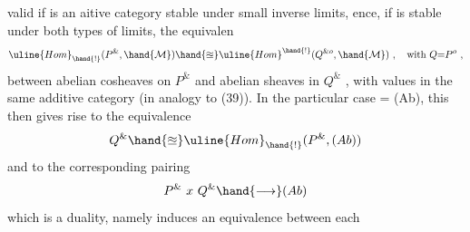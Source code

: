 valid if  is an aitive category stable under small inverse limits,
 ence, if  is  stable under both types of limits, the equivalen
\margin{(***)}
\[ \uline{Hom}_{\hand{!}}(P^{\&}, \hand{\mathcal{M}}) \hand{\approxeq} \uline{Hom}^{\hand{!}}(Q^{\& o}, \hand{\mathcal{M}}) \ , \quad \text{with } Q{=}P^{o} \ , \]
between abelian cosheaves on $P^{\&}$ and abelian sheaves in $Q^{\&}$ , with values
in the same  additive category (in analogy to (39)). In the
particular case = (Ab), this then gives rise to the equivalence
\[ Q^{\&} \hand{\approxeq} \uline{Hom}_{\hand{!}}(P^{\&}, (Ab)) \]
and to the corresponding pairing
\[ P^{\&} \ x \ Q^{\&} \hand{\longrightarrow} (Ab) \]
which is a duality, namely induces an equivalence between each  

